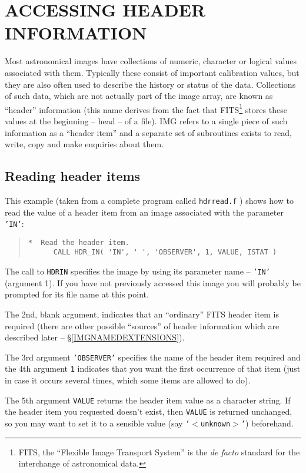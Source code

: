 \documentclass[twoside,11pt]{article}
\newcommand{\htmladdnormallink}[2]{#1}
\newcommand{\hyperref}[4]{#2\ref{#4}#3}
\newcommand{\htmlref}[2]{#1}
\renewcommand{\_}{\texttt{\symbol{95}}}
\newcommand{\myverb}[1]{{\texttt{#1}}}
\newenvironment{code}{\begin{small} \begin{quote}}
                     {\end{quote} \end{small}}
\begin{document}
\section{ACCESSING HEADER INFORMATION}
Most astronomical images have collections of numeric, character or
logical values associated with them. Typically these consist of
important calibration values, but they are also often used to describe
the history or status of the data. Collections of such data, which are
not actually part of the image array, are known as ``header''
information (this name derives from the fact that FITS\footnote{FITS,
the ``Flexible Image Transport System'' is the {\em de facto} standard
for the interchange of astronomical data.}  stores these values at the
beginning -- head -- of a file). IMG refers to a single piece of such
information as a ``header item'' and a separate set of subroutines
exists to read, write, copy and make enquiries about them.

\subsection{Reading header items}
This example (taken from a complete program called
\htmladdnormallink{\myverb{hdrread.f}}{../../bin/examples/img/hdrread.f}
) shows how to read the value of a
header item from an image associated with the parameter \myverb{'IN'}:
\begin{code}
\begin{verbatim}
*  Read the header item.
      CALL HDR_IN( 'IN', ' ', 'OBSERVER', 1, VALUE, ISTAT )
\end{verbatim}
\end{code}
The call to \htmlref{\myverb{HDR\_IN}}{HDR_INx} specifies the image by using its
parameter name -- \myverb{'IN'} (argument 1). If you have not
previously accessed this image you will probably be prompted for its
file name at this point.

The 2nd, blank argument, indicates that an ``ordinary'' FITS header
item is required (there are other possible ``sources'' of header information
which are described
\hyperref{elsewhere}{later -- \S}{}{IMGNAMEDEXTENSIONS}).

The 3rd argument \myverb{'OBSERVER'} specifies the name of the header
item required and the 4th argument \myverb{1} indicates that you want
the first occurrence of that item (just in case it occurs several
times, which some items are allowed to do).

The 5th argument \myverb{VALUE} returns the header item value as a
character string. If the header item you requested doesn't exist, then
\myverb{VALUE} is returned unchanged, so you may want to set it to a
sensible value (say \myverb{'$<$unknown$>$'}) beforehand.
\end{document}
